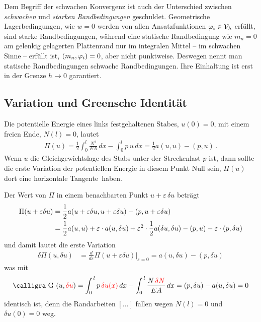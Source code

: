 \begin{remark}
Dem Begriff der schwachen Konvergenz ist auch der Unterschied zwischen {\em schwachen} und {\em starken Randbedingungen\/} geschuldet. Geometrische Lagerbedingungen, wie $w = 0$ werden von allen Ansatzfunktionen $\varphi_i \in \mathcal{V}_h$ erf\"{u}llt, sind starke Randbedingungen, w\"{a}hrend eine statische Randbedingung wie $m_n = 0$ am gelenkig gelagerten Plattenrand nur im integralen Mittel -- im schwachen Sinne -- erf\"{u}llt ist, $(m_n,\varphi_i) = 0$, aber nicht punktweise. Deswegen nennt man statische Randbedingungen schwache Randbedingungen. Ihre Einhaltung ist erst in der Grenze $h \to 0 $ garantiert.
\end{remark}
\pagebreak
\textcolor{sectionTitleBlue}{\section{Variation und Greensche Identit\"{a}t}}

Die potentielle Energie eines links festgehaltenen Stabes, $u(0) = 0$, mit einem freien Ende, $ N(l) = 0 $, lautet
\begin{align}
\Pi(u) = \frac{1}{2} \int_{0}^{l} \frac{N^2}{EA}\,dx - \int_{0}^{l}p\,u\,dx = \frac{1}{2} a(u,u) - (p,u)\,.
\end{align}
Wenn $u $ die Gleichgewichtslage des Stabs unter der Streckenlast $p$ ist, dann sollte die erste Variation der potentiellen Energie in diesem Punkt Null sein, $\Pi(u)$ dort eine \glq horizontale Tangente\grq\  haben.

Der Wert von $\Pi$ in einem benachbarten Punkt $u + \varepsilon \,\delta u$ betr\"{a}gt
\begin{align}
\Pi(u + \varepsilon \delta u) &= \frac{1}{2} a(u + \varepsilon \delta u,u + \varepsilon \delta u) - (p,u + \varepsilon \delta u) \nonumber \\
&= \frac{1}{2}a(u,u) + \varepsilon \cdot a(u,\delta u) + \varepsilon^2 \cdot \frac{1}{2} a(\delta u, \delta u) - (p,u) - \varepsilon \cdot (p,\delta u)
\end{align}
und damit lautet die erste Variation
\begin{align}
\delta \Pi(u, \delta u) &= \frac{d}{d\varepsilon} \Pi(u + \varepsilon \delta u)|_{\varepsilon = 0}
= a(u, \delta u) - (p, \delta u)
\end{align}
was mit
\begin{align}
\text{\normalfont\calligra G\,\,}(u,\textcolor{red}{\delta u}) = \int_0^{\,l} p \,\textcolor{red}{\delta u(x)}\,dx - \int_0^{\,l} \frac{N\,\textcolor{red}{\delta N}}{EA}\,dx = (p, \delta u) - a(u, \delta u) = 0
\end{align}
identisch ist, denn die Randarbeiten $[\ldots]$ fallen wegen $N(l) = 0 $ und $\delta u(0) = 0$ weg.

